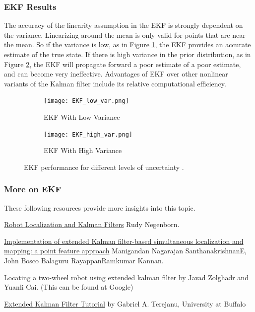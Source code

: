 \documentclass[twoside]{article}
\begin{document}
\subsubsection{EKF Results}
The accuracy of the linearity assumption in the EKF is strongly dependent on the variance. Linearizing around the mean is only valid for points that are near the mean. So if the variance is low, as in Figure \ref{fig:EKF_low_var}, the EKF provides an accurate estimate of the true state. If there is high variance in the prior distribution, as in Figure \ref{fig:EKF_high_var}, the EKF will propagate forward a poor estimate of a poor estimate, and can become very ineffective. Advantages of EKF over other nonlinear variants of the Kalman filter include its relative computational efficiency.

\begin{figure}[H]
\centering
\begin{subfigure}{.5\textwidth}
  \centering
  \texttt{[image: EKF\_low\_var.png]}
  \caption{EKF With Low Variance}
  \label{fig:EKF_low_var}
\end{subfigure}%
\begin{subfigure}{.5\textwidth}
  \centering
  \texttt{[image: EKF\_high\_var.png]}
  \caption{EKF With High Variance}
  \label{fig:EKF_high_var}
\end{subfigure}
\caption{EKF performance for different levels of uncertainty \cite{Xmisc}.}
\label{fig:EKF_variance}
\end{figure}
\subsubsection{More on EKF}

These following resources provide more insights into this topic.

\href{http://www.negenborn.net/kal_loc/thesis.pdf}{Robot Localization and Kalman Filters} Rudy Negenborn.


\href{https://link.springer.com/article/10.1007/s12046-017-0692-y}{Implementation of extended Kalman filter-based simultaneous
localization and mapping: a point feature approach} Manigandan Nagarajan SanthanakrishnanE, John Bosco Balaguru RayappanRamkumar Kannan.


Locating a two-wheel robot using extended kalman filter by Javad Zolghadr and Yuanli Cai. (This can be found at Google)


\href{https://www.cse.sc.edu/~terejanu/files/tutorialEKF.pdf}{Extended Kalman Filter Tutorial} by Gabriel A. Terejanu, University at Buffalo
\end{document}
